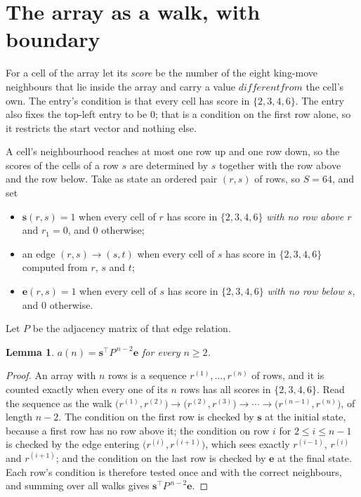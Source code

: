 \documentclass[11pt,a4paper]{article}
\theoremstyle{plain}
\newtheorem{lemma}[theorem]{Lemma}
\theoremstyle{definition}
\begin{document}
\section{The array as a walk, with boundary}

For a cell of the array let its \emph{score} be the number of the eight king-move neighbours that lie inside
the array and carry a value $different from$ the cell's own. The entry's condition is that every cell
has score in $\{2,3,4,6\}$. The entry also fixes the top-left entry to be $0$; that is a condition on the first row alone, so it restricts the start vector and nothing else.

A cell's neighbourhood reaches at most one row up and one row down, so the scores of the
cells of a row $s$ are determined by $s$ together with the row above and the row below.
Take as state an ordered pair $(r,s)$ of rows, so $S=64$, and set
\begin{itemize}
\item $\mathbf{s}(r,s)=1$ when every cell of $r$ has score in $\{2,3,4,6\}$ \emph{with no row
above $r$} and $r_1=0$, and $0$ otherwise;
\item an edge $(r,s)\to(s,t)$ when every cell of $s$ has score in $\{2,3,4,6\}$ computed from
$r$, $s$ and $t$;
\item $\mathbf{e}(r,s)=1$ when every cell of $s$ has score in $\{2,3,4,6\}$ \emph{with no row
below $s$}, and $0$ otherwise.
\end{itemize}
Let $P$ be the adjacency matrix of that edge relation.

\begin{lemma}\label{lem:walk}
$a(n)=\mathbf{s}^{\!\top}P^{\,n-2}\mathbf{e}$ for every $n\ge2$.
\end{lemma}

\begin{proof}
An array with $n$ rows is a sequence $r^{(1)},\dots,r^{(n)}$ of rows, and it is counted
exactly when every one of its $n$ rows has all scores in $\{2,3,4,6\}$. Read the sequence as the
walk $\bigl(r^{(1)},r^{(2)}\bigr)\to\bigl(r^{(2)},r^{(3)}\bigr)\to\cdots\to
\bigl(r^{(n-1)},r^{(n)}\bigr)$, of length $n-2$. The condition on the first row is
checked by $\mathbf{s}$ at the initial state, because a first row has no row above it; the
condition on row $i$ for $2\le i\le n-1$ is checked by the edge entering
$\bigl(r^{(i)},r^{(i+1)}\bigr)$, which sees exactly $r^{(i-1)}$, $r^{(i)}$ and
$r^{(i+1)}$; and the condition on the last row is checked by $\mathbf{e}$ at the final
state. Each row's condition is therefore tested once and with the correct neighbours, and
summing over all walks gives $\mathbf{s}^{\!\top}P^{\,n-2}\mathbf{e}$.
\end{proof}
\end{document}

